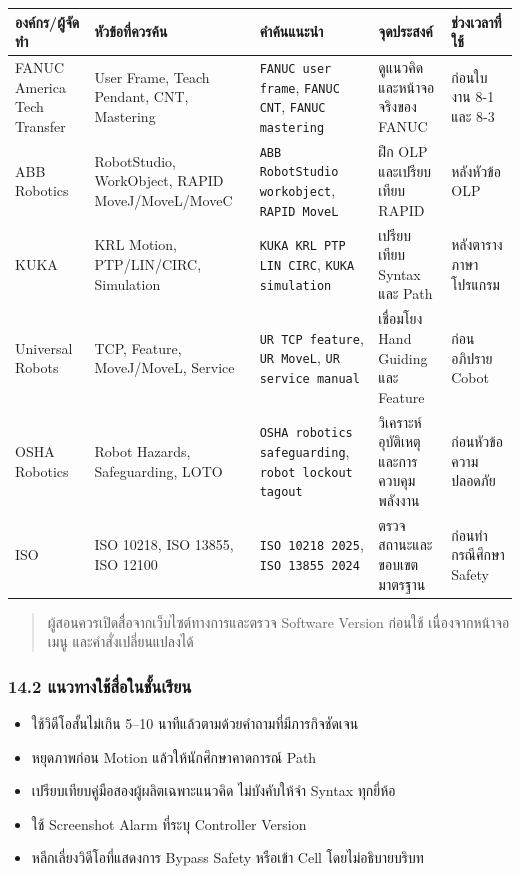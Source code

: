 \begin{table}[htbp]
    \centering
    \scriptsize
    \begin{tabularx}{\textwidth}{@{}L{0.17\textwidth}L{0.23\textwidth}L{0.22\textwidth}L{0.20\textwidth}Y@{}}
        \hline
        \textbf{องค์กร/ผู้จัดทำ} & \textbf{หัวข้อที่ควรค้น} & \textbf{คำค้นแนะนำ} & \textbf{จุดประสงค์} & \textbf{ช่วงเวลาที่ใช้} \\
        \hline
        FANUC America Tech Transfer & User Frame, Teach Pendant, CNT, Mastering & \texttt{FANUC user frame}, \texttt{FANUC CNT}, \texttt{FANUC mastering} & ดูแนวคิดและหน้าจอจริงของ FANUC & ก่อนใบงาน 8-1 และ 8-3 \\
        ABB Robotics & RobotStudio, WorkObject, RAPID MoveJ/MoveL/MoveC & \texttt{ABB RobotStudio workobject}, \texttt{RAPID MoveL} & ฝึก OLP และเปรียบเทียบ RAPID & หลังหัวข้อ OLP \\
        KUKA & KRL Motion, PTP/LIN/CIRC, Simulation & \texttt{KUKA KRL PTP LIN CIRC}, \texttt{KUKA simulation} & เปรียบเทียบ Syntax และ Path & หลังตารางภาษาโปรแกรม \\
        Universal Robots & TCP, Feature, MoveJ/MoveL, Service & \texttt{UR TCP feature}, \texttt{UR MoveL}, \texttt{UR service manual} & เชื่อมโยง Hand Guiding และ Feature & ก่อนอภิปราย Cobot \\
        OSHA Robotics & Robot Hazards, Safeguarding, LOTO & \texttt{OSHA robotics safeguarding}, \texttt{robot lockout tagout} & วิเคราะห์อุบัติเหตุและการควบคุมพลังงาน & ก่อนหัวข้อความปลอดภัย \\
        ISO & ISO 10218, ISO 13855, ISO 12100 & \texttt{ISO 10218 2025}, \texttt{ISO 13855 2024} & ตรวจสถานะและขอบเขตมาตรฐาน & ก่อนทำกรณีศึกษา Safety \\
        \hline
    \end{tabularx}
\end{table}

\begin{quote}
ผู้สอนควรเปิดสื่อจากเว็บไซต์ทางการและตรวจ Software Version ก่อนใช้ เนื่องจากหน้าจอ เมนู และคำสั่งเปลี่ยนแปลงได้
\end{quote}

\subsubsection{14.2 แนวทางใช้สื่อในชั้นเรียน}

\begin{itemize}
    \item ใช้วิดีโอสั้นไม่เกิน 5–10 นาทีแล้วตามด้วยคำถามที่มีภารกิจชัดเจน
    \item หยุดภาพก่อน Motion แล้วให้นักศึกษาคาดการณ์ Path
    \item เปรียบเทียบคู่มือสองผู้ผลิตเฉพาะแนวคิด ไม่บังคับให้จำ Syntax ทุกยี่ห้อ
    \item ใช้ Screenshot Alarm ที่ระบุ Controller Version
    \item หลีกเลี่ยงวิดีโอที่แสดงการ Bypass Safety หรือเข้า Cell โดยไม่อธิบายบริบท
\end{itemize}



